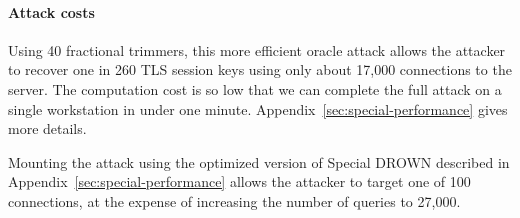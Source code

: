 \paragraph{Attack costs}
Using 40 fractional trimmers, this more efficient oracle attack allows
the attacker to recover one in 260 TLS session keys using only about
17,000 connections to the server.  The computation cost is so low that
we can complete the full attack on a single workstation in under one
minute. Appendix~\ref{sec:special-performance} gives more details.

Mounting the attack using the optimized version of Special DROWN
described in Appendix~\ref{sec:special-performance} allows the
attacker to target one of 100 connections, at the expense of
increasing the number of queries to 27,000.


